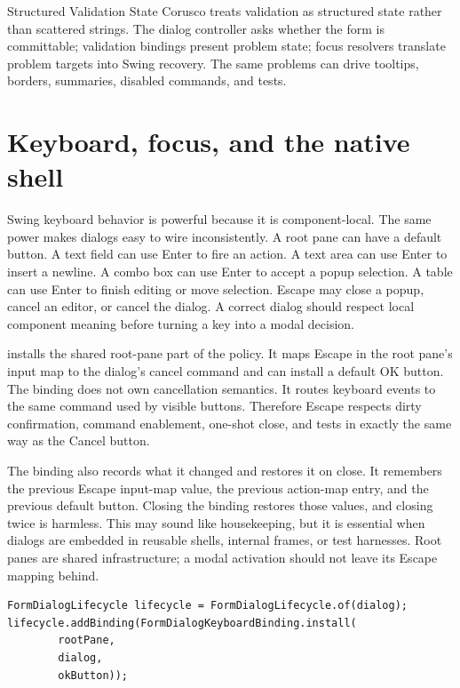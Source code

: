 \begin{coruscobox}{Structured Validation State}
Corusco treats validation as structured state rather than scattered strings.
The dialog controller asks whether the form is committable; validation bindings
present problem state; focus resolvers translate problem targets into Swing
recovery. The same problems can drive tooltips, borders, summaries, disabled
commands, and tests.
\end{coruscobox}

\section{Keyboard, focus, and the native shell}

Swing keyboard behavior is powerful because it is component-local. The same
power makes dialogs easy to wire inconsistently. A root pane can have a default
button. A text field can use Enter to fire an action. A text area can use Enter
to insert a newline. A combo box can use Enter to accept a popup selection. A
table can use Enter to finish editing or move selection. Escape may close a
popup, cancel an editor, or cancel the dialog. A correct dialog should respect
local component meaning before turning a key into a modal decision.

 installs the shared root-pane part of the
policy. It maps Escape in the root pane's  input
map to the dialog's cancel command and can install a default OK button. The
binding does not own cancellation semantics. It routes keyboard events to the
same command used by visible buttons. Therefore Escape respects dirty
confirmation, command enablement, one-shot close, and tests in exactly the same
way as the Cancel button.

The binding also records what it changed and restores it on close. It remembers
the previous Escape input-map value, the previous action-map entry, and the
previous default button. Closing the binding restores those values, and closing
twice is harmless. This may sound like housekeeping, but it is essential when
dialogs are embedded in reusable shells, internal frames, or test harnesses.
Root panes are shared infrastructure; a modal activation should not leave its
Escape mapping behind.

\begin{lstlisting}[caption={Keyboard binding belongs to the dialog lifecycle.}]
FormDialogLifecycle lifecycle = FormDialogLifecycle.of(dialog);
lifecycle.addBinding(FormDialogKeyboardBinding.install(
        rootPane,
        dialog,
        okButton));
\end{lstlisting}

